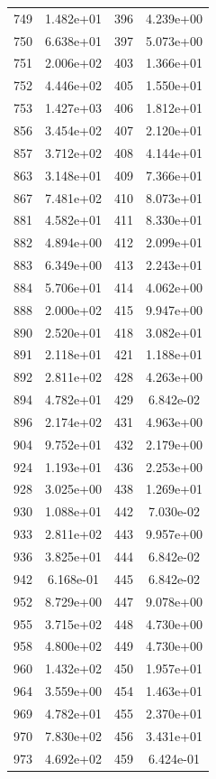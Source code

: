 \documentclass[12pt]{article}
\begin{document}
\begin{longtable}{@{}cccc@{}}
749 & 1.482e+01 & 396 & 4.239e+00 \\
750 & 6.638e+01 & 397 & 5.073e+00 \\
751 & 2.006e+02 & 403 & 1.366e+01 \\
752 & 4.446e+02 & 405 & 1.550e+01 \\
753 & 1.427e+03 & 406 & 1.812e+01 \\
856 & 3.454e+02 & 407 & 2.120e+01 \\
857 & 3.712e+02 & 408 & 4.144e+01 \\
863 & 3.148e+01 & 409 & 7.366e+01 \\
867 & 7.481e+02 & 410 & 8.073e+01 \\
881 & 4.582e+01 & 411 & 8.330e+01 \\
882 & 4.894e+00 & 412 & 2.099e+01 \\
883 & 6.349e+00 & 413 & 2.243e+01 \\
884 & 5.706e+01 & 414 & 4.062e+00 \\
888 & 2.000e+02 & 415 & 9.947e+00 \\
890 & 2.520e+01 & 418 & 3.082e+01 \\
891 & 2.118e+01 & 421 & 1.188e+01 \\
892 & 2.811e+02 & 428 & 4.263e+00 \\
894 & 4.782e+01 & 429 & 6.842e-02 \\
896 & 2.174e+02 & 431 & 4.963e+00 \\
904 & 9.752e+01 & 432 & 2.179e+00 \\
924 & 1.193e+01 & 436 & 2.253e+00 \\
928 & 3.025e+00 & 438 & 1.269e+01 \\
930 & 1.088e+01 & 442 & 7.030e-02 \\
933 & 2.811e+02 & 443 & 9.957e+00 \\
936 & 3.825e+01 & 444 & 6.842e-02 \\
942 & 6.168e-01 & 445 & 6.842e-02 \\
952 & 8.729e+00 & 447 & 9.078e+00 \\
955 & 3.715e+02 & 448 & 4.730e+00 \\
958 & 4.800e+02 & 449 & 4.730e+00 \\
960 & 1.432e+02 & 450 & 1.957e+01 \\
964 & 3.559e+00 & 454 & 1.463e+01 \\
969 & 4.782e+01 & 455 & 2.370e+01 \\
970 & 7.830e+02 & 456 & 3.431e+01 \\
973 & 4.692e+02 & 459 & 6.424e-01 \\

\end{longtable}
\end{document}
